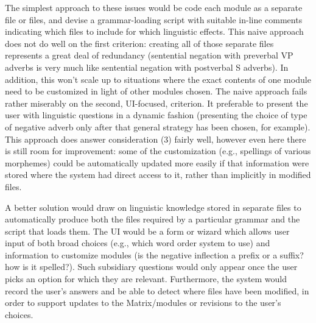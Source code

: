 The simplest approach to these issues would be code each module as a
separate file or files, and devise a grammar-loading script with
suitable in-line comments indicating which files to include for which
linguistic effects.  This naive approach does not do well on the first
criterion: creating all of those separate files represents a great
deal of redundancy (sentential negation with preverbal VP adverbs is
very much like sentential negation with postverbal S adverbs).
In addition, this won't scale up to
situations where the exact contents of one module need to be
customized in light of other modules chosen.  The naive approach fails
rather miserably on the second, UI-focused, criterion.  It 
preferable to present the user with linguistic questions in a dynamic
fashion (presenting the choice of type of negative adverb only after
that general strategy has been chosen, for example).  This approach
does answer consideration (3) fairly well, however
even here there is still room for improvement:
some of the customization (e.g., spellings of various morphemes) could
be automatically updated more easily if that information were stored
where the system had direct access to it, rather than implicitly in
modified files.

A better solution would draw on linguistic knowledge stored in
separate files to automatically produce both the files required by a
particular grammar and the script that loads them.  The UI 
would be a form or wizard which allows user input of both
broad choices (e.g., which word order system to use) and information
to customize modules (is the negative inflection a prefix or a suffix?
how is it spelled?).  Such subsidiary questions would only appear once
the user picks an option for which they are relevant. 
Furthermore, the system would record the user's answers 
and be able to detect where files have been modified, in order to
support updates to the Matrix/modules or revisions to the user's choices.

